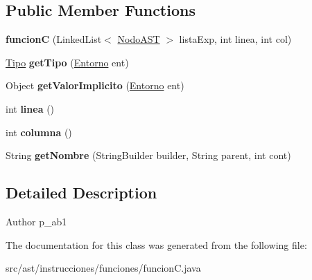 \subsection*{Public Member Functions}
\begin{DoxyCompactItemize}
\item 
\mbox{\label{classast_1_1instrucciones_1_1funciones_1_1funcion_c_af93ed562ec886978d49870d7270ef78a}} 
{\bfseries funcionC} (Linked\+List$<$ \mbox{\hyperlink{interfaceast_1_1_nodo_a_s_t}{Nodo\+A\+ST}} $>$ lista\+Exp, int linea, int col)
\item 
\mbox{\label{classast_1_1instrucciones_1_1funciones_1_1funcion_c_a32954fba31baaa1692ec25d40b6c39a3}} 
\mbox{\hyperlink{classentorno_1_1_tipo}{Tipo}} {\bfseries get\+Tipo} (\mbox{\hyperlink{classentorno_1_1_entorno}{Entorno}} ent)
\item 
\mbox{\label{classast_1_1instrucciones_1_1funciones_1_1funcion_c_af28116d5f1891f909fa514e912378cd1}} 
Object {\bfseries get\+Valor\+Implicito} (\mbox{\hyperlink{classentorno_1_1_entorno}{Entorno}} ent)
\item 
\mbox{\label{classast_1_1instrucciones_1_1funciones_1_1funcion_c_a9755ba403d4f39c9115bddfca8296fa7}} 
int {\bfseries linea} ()
\item 
\mbox{\label{classast_1_1instrucciones_1_1funciones_1_1funcion_c_a2f55b1386af476c0199472db95c5fd5a}} 
int {\bfseries columna} ()
\item 
\mbox{\label{classast_1_1instrucciones_1_1funciones_1_1funcion_c_aecf9833f34a1a9dec50dc3e09f6ff79e}} 
String {\bfseries get\+Nombre} (String\+Builder builder, String parent, int cont)
\end{DoxyCompactItemize}


\subsection{Detailed Description}
\begin{DoxyAuthor}{Author}
p\+\_\+ab1 
\end{DoxyAuthor}


The documentation for this class was generated from the following file\+:\begin{DoxyCompactItemize}
\item 
src/ast/instrucciones/funciones/funcion\+C.\+java\end{DoxyCompactItemize}
